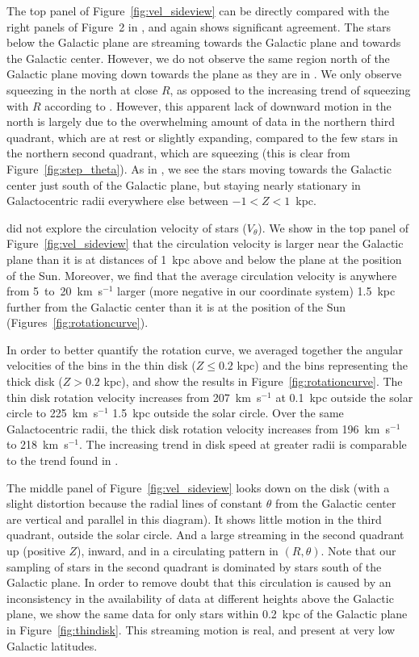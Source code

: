 \documentclass[11pt,preprint]{aastex6}
\begin{document}
The top panel of Figure~\ref{fig:vel_sideview} can be directly compared with the right panels of Figure~2 in , and again shows significant agreement. The stars below the Galactic plane are streaming towards the Galactic plane and towards the Galactic center. However, we do not observe the same region north of the Galactic plane moving down towards the plane as they are in . We only observe squeezing in the north at close $R$, as opposed to the increasing trend of squeezing with $R$ according to . However, this apparent lack of downward motion in the north is largely due to the overwhelming amount of data in the northern third quadrant, which are at rest or slightly expanding, compared to the few stars in the northern second quadrant, which are squeezing (this is clear from Figure~\ref{fig:step_theta}). As in , we see the stars moving towards the Galactic center just south of the Galactic plane, but staying nearly stationary in Galactocentric radii everywhere else between $-1<Z<1$~kpc.
 
 did not explore the circulation velocity of stars ($V_\theta$).  We show in the top panel of Figure~\ref{fig:vel_sideview} that the circulation velocity is larger near the Galactic plane than it is at distances of 1~kpc above and below the plane at the position of the Sun.  Moreover, we find that the average circulation velocity is anywhere from 5~to~20~km~s$^{-1}$ larger (more negative in our coordinate system) 1.5~kpc further from the Galactic center than it is at the position of the Sun (Figures~\ref{fig:rotationcurve}). 

In order to better quantify the rotation curve, we averaged together the angular velocities of the bins in the thin disk ($Z \le 0.2$ kpc) and the bins representing the thick disk ($Z > 0.2$ kpc), and show the results in Figure~\ref{fig:rotationcurve}.  The thin disk rotation velocity increases from 207~km~s$^{-1}$ at 0.1~kpc outside the solar circle to 225~km~s$^{-1}$ 1.5~kpc outside the solar circle.  Over the same Galactocentric radii, the thick disk rotation velocity increases from 196~km~s$^{-1}$ to 218~km~s$^{-1}$.  The increasing trend in disk speed at greater radii is comparable to the trend found in \citet{Lopez2014}.

 
The middle panel of Figure~\ref{fig:vel_sideview} looks down on the disk (with a slight distortion because the radial lines of constant $\theta$  from the Galactic center are vertical and parallel in this diagram).  It shows little motion in the third quadrant, outside the solar circle.  And a large streaming in the second quadrant up (positive $Z$), inward, and in a circulating pattern in $(R, \theta)$.  Note that our sampling of stars in the second quadrant is dominated by stars south of the Galactic plane.  In order to remove doubt that this circulation is caused by an inconsistency in the availability of data at different heights above the Galactic plane, we show the same data for only stars within 0.2~kpc of the Galactic plane in Figure~\ref{fig:thindisk}.  This streaming motion is real, and present at very low Galactic latitudes.
 
\end{document}
